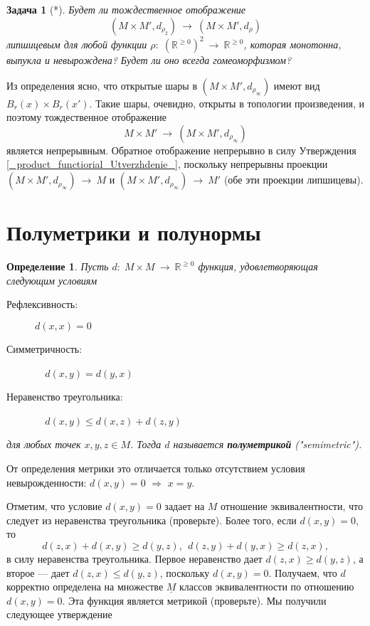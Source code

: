 \documentclass[12pt]{book}
\newcommand{\arrow}{{\:\longrightarrow\:}}
\def\R{{\mathbb R}}
\theoremstyle{upshape}
\newtheorem{zadacha}{Задача}[chapter]
\theoremstyle{generic}
\newtheorem{opredelenie}[teorema]{Определение}
\newtheorem{remark}[teorema]{Замечание}
\def\замечание{\begin{remark}}
\def\еза{\end{remark}}
\theoremstyle{upshapenonumber}
\newcommand{\следствие}{%
     \refstepcounter{teorema}
     {\noindent\bf Следствие \thechapter.\arabic{teorema}:\ }}
\newcommand{\пример}{%
     \refstepcounter{teorema}
     {\noindent\bf Пример \thechapter.\arabic{teorema}:\ }}
\newcommand{\лемма}{%
     \refstepcounter{teorema}
     {\noindent\bf Лемма \thechapter.\arabic{teorema}:\ }}
\newcommand{\теорема}{%
     \refstepcounter{teorema}
     {\noindent\bf Теорема \thechapter.\arabic{teorema}:\ }}
\newcommand{\утверждение}{%
     \refstepcounter{teorema}
     {\noindent\bf Утверждение \thechapter.\arabic{teorema}:\ }}
\def\бф{\bf}
\def\ем{\em}
\def\задача{\begin{zadacha}}
\def\ез{\end{zadacha}}
\def\еу{\end{ukazanie}}
\def\определение{\begin{opredelenie}}
\def\ео{\end{opredelenie}}
\def\енум{\begin{enumerate}}
\def\ее{\end{enumerate}}
\begin{document}
\задача[*]
Будет ли тождественное отображение
\[ (M\times M', d_{\rho_2}) \arrow (M\times M', d_{\rho})\]
липшицевым для любой функции
$\rho:\; (\R^{\geq 0})^2\arrow \R^{\geq 0}$,
которая монотонна, выпукла и невырождена?
Будет ли оно всегда гомеоморфизмом?
\ез

Из определения ясно, что открытые шары
в $(M\times M', d_{\rho_\infty})$ имеют вид
$B_r(x) \times B_r(x')$. Такие шары, очевидно,
открыты в топологии произведения, и поэтому тождественное
отображение \[ M\times M'\arrow (M\times M', d_{\rho_\infty})\]
является непрерывным. Обратное отображение
непрерывно в силу Ут\-вер\-ждения
\ref{_product_functiorial_Utverzhdenie_}, 
поскольку непрерывны проекции
$(M\times M', d_{\rho_\infty}) \arrow M$
и $(M\times M', d_{\rho_\infty}) \arrow M'$
(обе эти проекции липшицевы). 



\section{Полуметрики и полунормы}



\определение
Пусть $d:\; M \times M \arrow \R^{\geq 0}$
функция, удовлетворяющая следующим условиям
\begin{description}
\item[Рефлексивность:] $d(x,x)=0$
\item[Симметричность:]\ \  $d(x,y)=d(y,x)$
\item[Неравенство треугольника:]\ \  $d(x,y) \leq d(x, z) + d(z,y)$
\end{description}
для любых точек $x,y,z\in M$.
Тогда $d$ называется {\бф полуметрикой} ("semimetric").
\ео

От определения метрики это отличается только
отсутствием условия невырожденности: $d(x,y)=0$
$\Rightarrow$ $x=y$.

Отметим, что условие $d(x,y)=0$ задает на $M$
отношение эквивалентности, что следует из неравенства
треугольника (проверьте). Более того, если $d(x,y)=0$,
то
\[
d(z,x) + d(x,y) \geq d(y,z), \ \ d(z,y) + d(y,x) \geq d(z,x),
\]
в силу неравенства треугольника. Первое неравенство дает
$d(z,x)  \geq d(y,z)$, а второе --- дает $d(z,x)  \leq d(y,z)$,
поскольку $d(x,y)=0$. Получаем, что $d$ корректно определена на 
множестве $\underline M$ классов эквивалентности по отношению $d(x,y)=0$.
Эта функция является метрикой (проверьте). Мы получили
следующее утверждение
\end{document}
